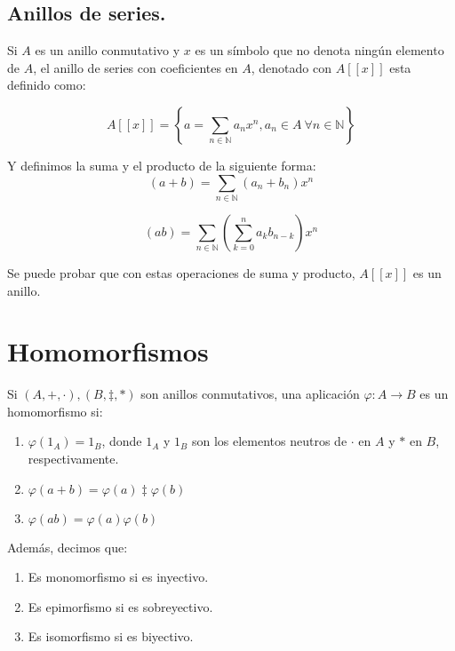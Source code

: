 \subsection*{Anillos de series.}
\begin{ndef}
  Si $A$ es un anillo conmutativo y $x$ es un símbolo que no denota ningún elemento de $A$, el anillo de series con coeficientes en $A$, denotado con $A[[x]]$ esta definido como:

\[
    A[[x]] = \left\{a = \displaystyle\sum_{n\in \mathbb{N}} a_n x^n , a_n \in A\ \forall	n \in \mathbb{N}\right\}
\]

Y definimos la suma y el producto de la siguiente forma:\\
\[(a+b) = \sum_{n\in \mathbb{N}}(a_n+b_n)x^n\]

\[ (ab) = \sum_{n\in \mathbb{N}} \left(\sum_{k=0}^n a_k b_{n-k}\right)x^n\]

\end{ndef}

Se puede probar que con estas operaciones de suma y producto, $A[[x]]$ es un anillo.

\section{Homomorfismos}

\begin{ndef}
Si $(A, +, \cdot), (B, \ddagger, \ast)$ son anillos conmutativos, una aplicación $\varphi: A \to B$ es un homomorfismo si:

\begin{enumerate}
	\item $\varphi(1_A) = 1_B$, donde $1_A$ y $1_B$ son los elementos neutros de $\cdot$ en $A$ y $\ast$ en $B$, respectivamente.
	\item $\varphi(a+b) = \varphi(a) \ddagger \varphi(b)$
	\item $\varphi(ab) = \varphi(a)  \varphi(b)$

\end{enumerate}

\end{ndef}

Además, decimos que:

\begin{enumerate}
	\item Es monomorfismo si es inyectivo.
	\item Es epimorfismo si es sobreyectivo.
	\item Es isomorfismo si es biyectivo.
\end{enumerate}

